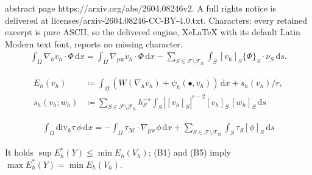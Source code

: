 \documentclass[10pt,a4paper]{amsart}
\newcommand{\Mcal}{\mathcal{M}}
\newcommand{\pw}{\mathrm{pw}}
\renewcommand{\div}{\mathrm{div}}
\renewcommand{\d}[1]{\,\mathrm{d}#1}
\begin{document}
abstract page https://arxiv.org/abs/2604.08246v2. A full rights notice is delivered at licenses/arxiv-2604.08246-CC-BY-4.0.txt. Characters: every retained excerpt is pure ASCII, so the delivered engine, XeLaTeX with its default Latin Modern text font, reports no missing character.
\begin{align}\label{def:ldg-dicrete-gradient}
	\int_\Omega \nabla_h v_h \cdot \Phi \d{x}
	= \int_\Omega \nabla_\pw v_h \cdot \Phi \d{x} - \sum_{S \in \mathcal{F}\setminus\mathcal{F}_\mathrm{N}} \int_S [v_h]_S \{\Phi\}_S\cdot \nu_S \d{s}.
\end{align}

\begin{align}\label{def:discrete_energy}
	E_h(v_h) &\coloneqq \int_\Omega (W(\nabla_h v_h) 
    + \psi_h(\bullet,v_h)) \d{x} + s_h(v_h)/r,\\
    s_h(v_h; w_h) &\coloneqq 
    \sum_{S \in \mathcal{F} \setminus \mathcal{F}_\mathrm{N}} 
    h_S^{-s}\int_S |[v_h]_S|^{r-2} [v_h]_S\,[w_h]_S \d{s}
\label{def:stabilization-ldg}
\end{align}

\begin{align}\label{def:div-rec}
	\int_\Omega \div_h \tau\, \phi \d{x} = -\int_\Omega \tau_\Mcal \cdot \nabla_\pw \phi \d{x} + \sum_{S \in \mathcal{F} \setminus \mathcal{F}_\mathrm{N}} \int_S \tau_S [\phi]_S \d{s} 
\end{align}

\begin{theorem}\label{thm:weak-duality}
	It holds $\sup E_h^*(Y) \leq \min E_h(V_h)$; (B1) and (B5) imply 
		$\max E_h^*(Y) = \min E_h(V_h)$.
\end{theorem}
\end{document}
